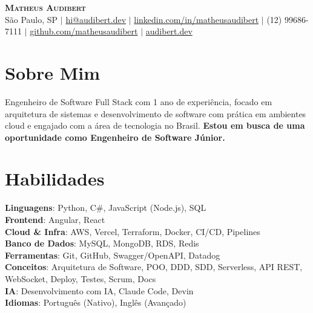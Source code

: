 \documentclass[letterpaper,11pt]{article}
\begin{document}
\begin{center}
    {\Huge \scshape \textcolor{AccentColor}{\textbf{Matheus Audibert}}} \\ \vspace{1pt}
    \small
    São Paulo, SP $|$
    \href{mailto:hi@audibert.dev}{hi@audibert.dev} $|$
    \href{https://www.linkedin.com/in/matheusaudibert}{linkedin.com/in/matheusaudibert} $|$
    (12) 99686-7111 $|$
    \href{https://github.com/matheusaudibert}{github.com/matheusaudibert} $|$
    \href{https://audibert.dev}{audibert.dev}
\end{center}

\section{Sobre Mim}
\begin{itemize}[leftmargin=0.15in, label={}]
\small{\item{
Engenheiro de Software Full Stack com 1 ano de experiência, focado em arquitetura de sistemas e desenvolvimento de software com prática em ambientes cloud e engajado com a área de tecnologia no Brasil. \textbf{Estou em busca de uma oportunidade como Engenheiro de Software Júnior.}
}}
\end{itemize}

\section{Habilidades}
\begin{itemize}[leftmargin=0.15in, label={}]
\small{\item{
\textbf{Linguagens}: Python, C\#, JavaScript (Node.js), SQL \\
\textbf{Frontend}: Angular, React \\
\textbf{Cloud \& Infra}: AWS, Vercel, Terraform, Docker, CI/CD, Pipelines \\
\textbf{Banco de Dados}: MySQL, MongoDB, RDS, Redis \\
\textbf{Ferramentas}: Git, GitHub, Swagger/OpenAPI, Datadog \\
\textbf{Conceitos}: Arquitetura de Software, POO, DDD, SDD, Serverless, API REST, WebSocket, Deploy, Testes, Scrum, Docs \\
\textbf{IA}: Desenvolvimento com IA, Claude Code, Devin \\
\textbf{Idiomas}: Português (Nativo), Inglês (Avançado)
}}
\end{itemize}
\end{document}
